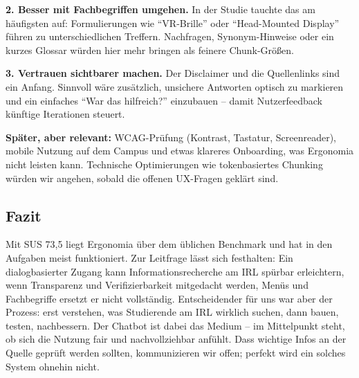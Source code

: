 \textbf{2. Besser mit Fachbegriffen umgehen.} In der Studie tauchte das am häufigsten auf: Formulierungen wie ``VR-Brille'' oder ``Head-Mounted Display'' führen zu unterschiedlichen Treffern. Nachfragen, Synonym-Hinweise oder ein kurzes Glossar würden hier mehr bringen als feinere Chunk-Größen.

\textbf{3. Vertrauen sichtbarer machen.} Der Disclaimer und die Quellenlinks sind ein Anfang. Sinnvoll wäre zusätzlich, unsichere Antworten optisch zu markieren und ein einfaches ``War das hilfreich?'' einzubauen -- damit Nutzerfeedback künftige Iterationen steuert.

\textbf{Später, aber relevant:} WCAG-Prüfung (Kontrast, Tastatur, Screenreader), mobile Nutzung auf dem Campus und etwas klareres Onboarding, was Ergonomia nicht leisten kann. Technische Optimierungen wie tokenbasiertes Chunking würden wir angehen, sobald die offenen UX-Fragen geklärt sind.

\subsection{Fazit}

Mit SUS 73,5 liegt Ergonomia über dem üblichen Benchmark und hat in den Aufgaben meist funktioniert. Zur Leitfrage lässt sich festhalten: Ein dialogbasierter Zugang kann Informationsrecherche am IRL spürbar erleichtern, wenn Transparenz und Verifizierbarkeit mitgedacht werden, Menüs und Fachbegriffe ersetzt er nicht vollständig. Entscheidender für uns war aber der Prozess: erst verstehen, was Studierende am IRL wirklich suchen, dann bauen, testen, nachbessern. Der Chatbot ist dabei das Medium -- im Mittelpunkt steht, ob sich die Nutzung fair und nachvollziehbar anfühlt. Dass wichtige Infos an der Quelle geprüft werden sollten, kommunizieren wir offen; perfekt wird ein solches System ohnehin nicht.
